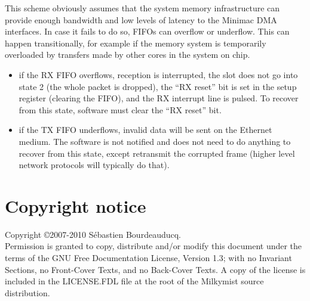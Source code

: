 \documentclass[a4paper,11pt]{article}
\begin{document}
This scheme obviously assumes that the system memory infrastructure can provide enough bandwidth and low levels of latency to the Minimac DMA interfaces. In case it fails to do so, FIFOs can overflow or underflow. This can happen transitionally, for example if the memory system is temporarily overloaded by transfers made by other cores in the system on chip.

\begin{itemize}
\item if the RX FIFO overflows, reception is interrupted, the slot does not go into state 2 (the whole packet is dropped), the ``RX reset'' bit is set in the setup register (clearing the FIFO), and the RX interrupt line is pulsed. To recover from this state, software must clear the ``RX reset'' bit.
\item if the TX FIFO underflows, invalid data will be sent on the Ethernet medium. The software is not notified and does not need to do anything to recover from this state, except retransmit the corrupted frame (higher level network protocols will typically do that).
\end{itemize}

\section*{Copyright notice}
Copyright \copyright 2007-2010 S\'ebastien Bourdeauducq. \\
Permission is granted to copy, distribute and/or modify this document under the terms of the GNU Free Documentation License, Version 1.3; with no Invariant Sections, no Front-Cover Texts, and no Back-Cover Texts. A copy of the license is included in the LICENSE.FDL file at the root of the Milkymist source distribution.
\end{document}
